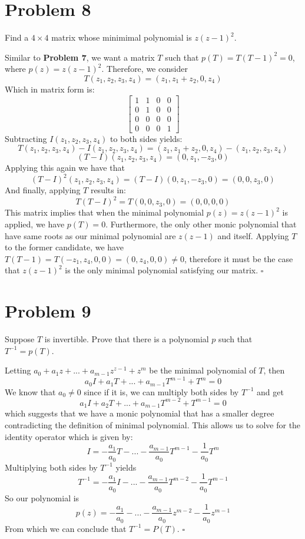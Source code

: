 \documentclass[12pt]{article}
\newenvironment{proof}{\noindent{\bf Proof.}}{\hfill $\square$\medskip}
\begin{document}
\newpage
\section{Problem 8}
Find a $4\times4$ matrix whose minimimal polynomial is $z(z-1)^{2}$.

\begin{proof}
    Similar to \textbf{Problem 7}, we want a matrix $T$ such that $p(T)=T(T-1)^{2}=0$, where $p(z)=z(z-1)^{2}$. Therefore, we consider
    $$T(z_{1},z_{2},z_{3},z_{4})=(z_{1},z_{1}+z_{2},0,z_{4})$$
    Which in matrix form is:
    $$
        \begin{bmatrix}
            1 & 1 & 0 & 0 \\
            0 & 1 & 0 & 0 \\
            0 & 0 & 0 & 0 \\
            0 & 0 & 0 & 1
        \end{bmatrix}
    $$
    Subtracting $I(z_{1},z_{2},z_{3},z_{4})$ to both sides yields:
    $$T(z_{1},z_{2},z_{3},z_{4})-I(z_{1},z_{2},z_{3},z_{4})=(z_{1},z_{1}+z_{2},0,z_{4})-(z_{1},z_{2},z_{3},z_{4})$$
    $$(T-I)(z_{1},z_{2},z_{3},z_{4})=(0,z_{1},-z_{3},0)$$
    Applying this again we have that
    $$(T-I)^{2}(z_{1},z_{2},z_{3},z_{4})=(T-I)(0,z_{1},-z_{3},0)=(0,0,z_{3},0)$$
    And finally, applying $T$ results in:
    $$T(T-I)^{2}=T(0,0,z_{3},0)=(0,0,0,0)$$
    This matrix implies that when the minimal polynomial $p(z)=z(z-1)^{2}$ is applied, we have $p(T)=0$. Furthermore, the only other monic polynomial that have same roots as our minimal polynomial are $z(z-1)$ and itself. Applying $T$ to the former candidate, we have $T(T-1)=T(-z_{1},z_{4},0,0)=(0,z_{4},0,0)\neq0$, therefore it must be the case that $z(z-1)^{2}$ is the only minimal polynomial satisfying our matrix.
\end{proof}


\newpage
\section{Problem 9}
Suppose $T$ is invertible. Prove that there is a polynomial $p$ such that $T^{-1}=p(T)$.

\begin{proof}
    Letting $a_{0}+a_{1}z+...+a_{m-1}z^{z-1}+z^{m}$ be the minimal polynomial of $T$, then
    $$a_{0}I+a_{1}T+...+a_{m-1}T^{m-1}+T^{m}=0$$
    We know that $a_{0}\neq0$ since if it is, we can multiply both sides by $T^{-1}$ and get
    $$a_{1}I+a_{2}T+...+a_{m-1}T^{m-2}+T^{m-1}=0$$
    which suggests that we have a monic polynomial that has a smaller degree contradicting the definition of minimal polynomial. This allows us to solve for the identity operator which is given by:
    $$I=-\frac{a_{1}}{a_{0}}T-...-\frac{a_{m-1}}{a_{0}}T^{m-1}-\frac{1}{a_{0}}T^{m}$$
    Multiplying both sides by $T^{-1}$ yields
    $$T^{-1}=-\frac{a_{1}}{a_{0}}I-...-\frac{a_{m-1}}{a_{0}}T^{m-2}-\frac{1}{a_{0}}T^{m-1}$$
    So our polynomial is
    $$p(z)=-\frac{a_{1}}{a_{0}}-...-\frac{a_{m-1}}{a_{0}}z^{m-2}-\frac{1}{a_{0}}z^{m-1}$$
    From which we can conclude that $T^{-1}=P(T)$.
\end{proof}
\end{document}
